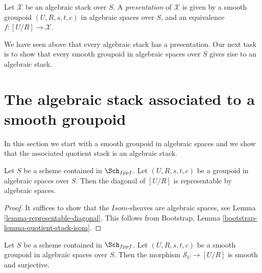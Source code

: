 \begin{definition}
\label{definition-presentation}
Let $\mathcal{X}$ be an algebraic stack over $S$.
A {\it presentation} of $\mathcal{X}$ is given by a smooth groupoid
$(U, R, s, t, c)$ in algebraic spaces over $S$, and an
equivalence $f : [U/R] \to \mathcal{X}$.
\end{definition}

\noindent
We have seen above that every algebraic stack has a presentation.
Our next task is to show that every smooth groupoid in algebraic
spaces over $S$ gives rise to an algebraic stack.


\section{The algebraic stack associated to a smooth groupoid}
\label{section-smooth-groupoid-gives-algebraic-stack}

\noindent
In this section we start with a smooth groupoid in algebraic spaces
and we show that the associated quotient stack is an algebraic stack.

\begin{lemma}
\label{lemma-diagonal-quotient-stack}
Let $S$ be a scheme contained in $\Sch_{fppf}$.
Let $(U, R, s, t, c)$ be a groupoid in algebraic spaces over $S$.
Then the diagonal of $[U/R]$ is representable by algebraic spaces.
\end{lemma}

\begin{proof}
It suffices to show that the $\mathit{Isom}$-sheaves are algebraic
spaces, see
Lemma \ref{lemma-representable-diagonal}.
This follows from
Bootstrap, Lemma \ref{bootstrap-lemma-quotient-stack-isom}.
\end{proof}

\begin{lemma}
\label{lemma-smooth-quotient-smooth-presentation}
Let $S$ be a scheme contained in $\Sch_{fppf}$.
Let $(U, R, s, t, c)$ be a smooth groupoid in algebraic spaces over $S$.
Then the morphism $\mathcal{S}_U \to [U/R]$ is smooth and surjective.
\end{lemma}

